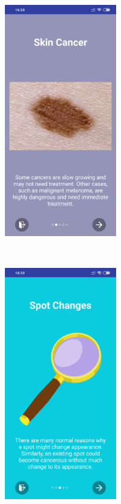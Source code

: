 \clearpage
\begin{figure}[t!]
    \centering
    \begin{subfigure}[t]{0.5\textwidth}
        \centering
        \includegraphics[height=10cm]{figures/info1_android.png}
        \caption{}
    \end{subfigure}%
    ~
    \begin{subfigure}[t]{0.5\textwidth}
        \centering
        \includegraphics[height=10cm]{figures/info2_android.png}
        \caption{}
    \end{subfigure}
    \begin{subfigure}[t]{0.5\textwidth}
        \centering

\end{subfigure}
\end{figure}
